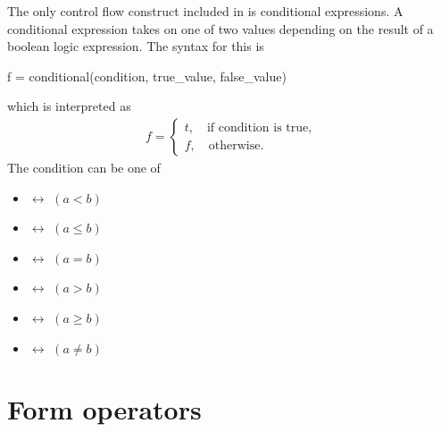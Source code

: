 The only control flow construct included in \ufl{} is
conditional expressions. A conditional expression
takes on one of two values depending on the result
of a boolean logic expression. The syntax for this is
\begin{python}
f = conditional(condition, true_value, false_value)
\end{python}
which is interpreted as
\begin{align}
f = \begin{cases}
    t, \quad \mbox{if condition is true}, \\
    f, \quad \mbox{otherwise}.
    \end{cases}
\end{align}
The condition can be one of
\begin{multicols}{2}
\begin{itemize}
\item {} $\leftrightarrow$ $(a < b)$
\item {} $\leftrightarrow$ $(a \le b)$
\item {} $\leftrightarrow$ $(a = b)$
\end{itemize}
\begin{itemize}
\item {} $\leftrightarrow$ $(a > b)$
\item {} $\leftrightarrow$ $(a \ge b)$
\item {} $\leftrightarrow$ $(a \ne b)$
\end{itemize}
\end{multicols}

\section{Form operators} \label{ufl:sec:formtransformations}

